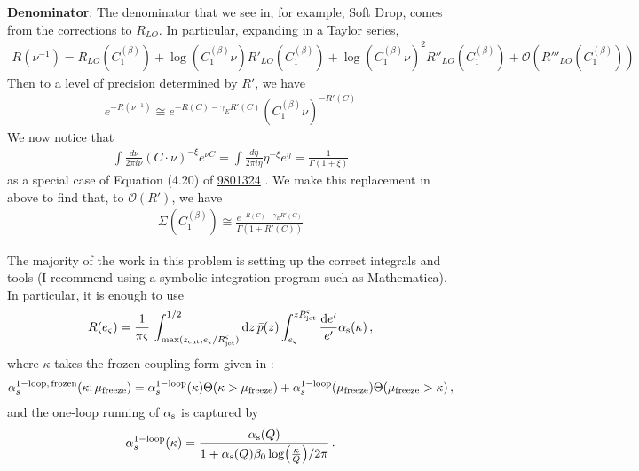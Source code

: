 \textbf{Denominator}:
The denominator that we see in, for example, Soft Drop, comes from the corrections to \(R_{LO}\). In particular, expanding in a Taylor series,
\begin{align}
    R(\nu^{-1}) = R_{LO}(C_1^{(\beta)}) + \log(C_1^{(\beta)} \nu) R'_{LO}(C_1^{(\beta)}) + \log(C_1^{(\beta)} \nu)^2 R''_{LO}(C_1^{(\beta)}) + \mathcal{O}(R'''_{LO}(C_1^{(\beta)}))
\end{align}
Then to a level of precision determined by \(R'\), we have
\begin{align}
    e^{-R(\nu^{-1})} \cong e^{-R(C) - \gamma_E R'(C)} (C_1^{(\beta)} \nu)^{-R'(C)}
\end{align}
We now notice that
\begin{align}
    \int \frac{d\nu}{2\pi i \nu} (C\cdot \nu)^{-\xi} e^{\nu C} = \int \frac{d\eta}{2\pi i \eta} \eta^{-\xi}e^\eta = \frac{1}{\Gamma(1 + \xi)}
\end{align}
as a special case of Equation (4.20) of \href{https://arxiv.org/pdf/hep-ph/9801324.pdf}{9801324} . We make this replacement in  above to find that, to \(\mathcal{O}(R')\), we have
\begin{align}
    \Sigma(C_1^{(\beta)}) \cong \frac{e^{-R(C) - \gamma_E R'(C)}}{\Gamma(1 + R'(C))}
\end{align}


\fi




The majority of the work in this problem is setting up the correct integrals and tools (I recommend using a symbolic integration program such as Mathematica).
%
In particular, it is enough to use
\begin{align}
    R(e_\varsigma)
    =
    \frac{1}{\pi \varsigma}
    \,
    \int_{\max(z_{\rm cut}, e_\varsigma/R_\text{jet}^\varsigma)}^{1/2}
    \dd z\, \bar{p}(z)
    \int_{e_\varsigma}^{z R_\text{jet}^\varsigma}
    \frac{\dd e'}{e'}
    \alpha_{\mathrm{s}}(\kappa)
    \,,
\end{align}
where \(\kappa\) takes the frozen coupling form given in :
\begin{align}
    \alpha^{\rm 1-loop,\,frozen}_s(\kappa; \mu_{\rm freeze})
    =
    \alpha^{\rm 1-loop}_s(\kappa)
    \Theta(\kappa > \mu_{\rm freeze})
    +
    \alpha^{\rm 1-loop}_s(\mu_{\rm freeze})
    \Theta(\mu_{\rm freeze} > \kappa)
    \,,
    \label{eq:frozen-coupling}
\end{align}
and the one-loop running of \(\alpha_{\mathrm{s}}\) is captured by
\begin{align}
    \alpha^{\rm 1-loop}_s(\kappa)
    =
    \frac{\alpha_{\mathrm{s}}(Q)}{1 + \alpha_{\mathrm{s}}(Q) \beta_0 \log(\frac{\kappa}{Q})/2\pi}
    \,.
\end{align}


